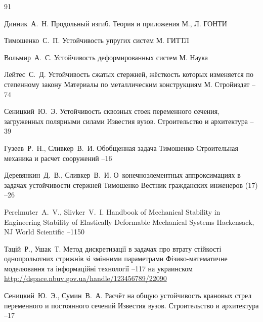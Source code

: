 \RusRef
\begin{thebibliography}{91}

\by Динник~А.~Н.
\book  Продольный изгиб. Теория и приложения
\publaddr  М., Л.
\publ ГОНТИ

\by Тимошенко~С.~П.
\book  Устойчивость упругих систем
\publaddr М.
\publ ГИТТЛ

\by Вольмир~А.~С.
\book  Устойчивость деформированных систем
\publaddr М.
\publ Наука

\by Лейтес~С.~Д.
\paper Устойчивость сжатых стержней, жёсткость которых изменяется по степенному закону
\inbook Материалы по металлическим конструкциям
\publaddr М.
\publ Стройиздат 
--74

\by Сеницкий~Ю.~Э.
\paper  Устойчивость сквозных стоек переменного сечения, загруженных полярными силами
\jour Известия вузов. Строительство и архитектура 
--39

\by Гузеев~Р.~Н., Сливкер~В.~И.
\paper  Обобщенная задача Тимошенко
\jour Строительная механика и расчет сооружений
--16

\by Деревянкин~Д.~В., Сливкер~В.~И.
\paper О~конечноэлементных аппроксимациях в задачах устойчивости стержней Тимошенко
\jour Вестник гражданских инженеров
(17)
--26

\by Perelmuter~A.~V., Slivker~V.~I. 
\book Handbook of Mechanical Stability in Engineering
\volinfo  Stability of Elastically Deformable Mechanical Systems
\publaddr Hackensack, NJ
\publ World Scientific
--1150

\by  Тацій~Р., Ушак~Т.
\paper Метод дискретизації в задачах про втрату стійкості однопрольотних стрижнів зі змінними параметрами
\jour  Фізико-математичне моделювання та інформаційні технології
--117
\lang на украинском
\elink \url{http://dspace.nbuv.gov.ua/handle/123456789/22090}

\by Сеницкий~Ю.~Э., Сумин~В.~А.
\paper Расчёт на общую устойчивость крановых стрел переменного и постоянного сечений
\jour Известия вузов. Строительство и архитектура
--17


\end{thebibliography}
